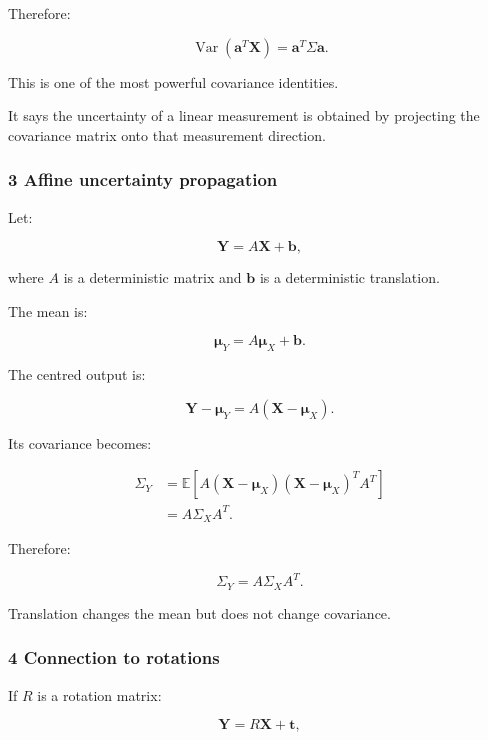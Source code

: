 Therefore:

\[
 \boxed{ \operatorname{Var}(\mathbf a^T\mathbf X) = \mathbf a^T\Sigma\mathbf a }.
\]

This is one of the most powerful covariance identities.

It says the uncertainty of a linear measurement is obtained by projecting the covariance matrix onto that measurement direction.

\subsubsection{3 Affine uncertainty propagation}\label{02-foundations-ii-ch024-affine-uncertainty-propagation}

\hypertarget{02-foundations-ii-ch024-affine-uncertainty-propagation}{}

Let:

\[
 \mathbf Y=A\mathbf X+\mathbf b,
\]

where \(A\) is a deterministic matrix and \(\mathbf b\) is a deterministic translation.

The mean is:

\[
 \boxed{ \boldsymbol\mu_Y=A\boldsymbol\mu_X+\mathbf b }.
\]

The centred output is:

\[
 \mathbf Y-\boldsymbol\mu_Y = A(\mathbf X-\boldsymbol\mu_X).
\]

Its covariance becomes:

\[
 \begin{aligned} \Sigma_Y &= \mathbb E[ A(\mathbf X-\boldsymbol\mu_X) (\mathbf X-\boldsymbol\mu_X)^TA^T ]\\ &= A\Sigma_XA^T. \end{aligned}
\]

Therefore:

\[
 \boxed{ \Sigma_Y=A\Sigma_XA^T }.
\]

Translation changes the mean but does not change covariance.

\subsubsection{4 Connection to rotations}\label{02-foundations-ii-ch024-connection-to-rotations}

\hypertarget{02-foundations-ii-ch024-connection-to-rotations}{}

If \(R\) is a rotation matrix:

\[
 \mathbf Y=R\mathbf X+\mathbf t,
\]


